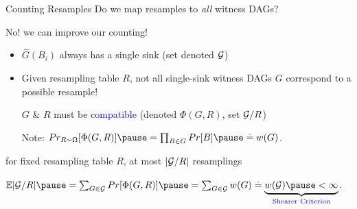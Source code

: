 \documentclass{beamer}
\def\padding{\vspace{0.5cm}}
\def\spadding{\vspace{0.25cm}}
\def\b{\textcolor{blue}}
\newcommand*{\eqdef}{\overset{.}{=}}
\begin{document}
\begin{frame}{Counting Resamples}
Do we map resamples to \emph{all} witness DAGs?\pause\par
No! \follows we can improve our counting!\pause\spadding

\begin{itemize}
    \item $\hat{G}(B_i)$ always has a single sink (set denoted $\mathcal{G}$)\pause
    \item Given resampling table $R$, not all single-sink witness DAGs $G$ correspond to a possible resample!\pause
    
    
    \follows $G$ \& $R$ must be \b{compatible} \pause(denoted $\Phi(G, R)$, set $\mathcal{G}/R$)\pause\spadding
    
    Note: $\Pr[R\sim\Omega]{\Phi(G,R)} \pause= \prod_{B \in G} \Pr{B} \pause\eqdef w(G)$.
\end{itemize}\pause\spadding

\follows for fixed resampling table $R$, at most $|\mathcal{G}/R|$ resamplings\pause\padding

$\E{|\compat{\G}{R}|} \pause= \sum_{G \in \G} \Pr{\Phi(G,R)} \pause= \sum_{G\in\G} w(G) \eqdef \underbrace{w(\G) \pause < \infty}_{\text{\b{Shearer Criterion}}}$.
\end{frame}

    
    
    
\end{document}
